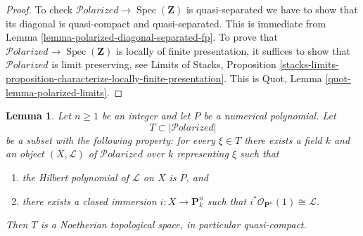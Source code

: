 \documentclass{stacks-project}
\theoremstyle{plain}
\newtheorem{lemma}[subsection]{Lemma}
\theoremstyle{definition}
\theoremstyle{remark}
\numberwithin{equation}{subsection}
\def\Spec{\mathop{\mathrm{Spec}}}
\def\Polarizedstack{\mathcal{P}\!\mathit{olarized}}
\begin{document}
\begin{proof}
To check $\Polarizedstack \to \Spec(\mathbf{Z})$ is quasi-separated we have to
show that its diagonal is quasi-compact and quasi-separated.
This is immediate from Lemma \ref{lemma-polarized-diagonal-separated-fp}.
To prove that $\Polarizedstack \to \Spec(\mathbf{Z})$ is locally of finite
presentation, it suffices to show that $\Polarizedstack$
is limit preserving, see Limits of Stacks, Proposition
\ref{stacks-limits-proposition-characterize-locally-finite-presentation}.
This is Quot, Lemma \ref{quot-lemma-polarized-limits}.
\end{proof}

\begin{lemma}
\label{lemma-bounded-polarized}
Let $n \geq 1$ be an integer and let $P$ be a numerical polynomial.
Let
$$
T \subset |\Polarizedstack|
$$
be a subset with the following property: for every $\xi \in T$
there exists a field $k$ and an object $(X, \mathcal{L})$
of $\Polarizedstack$ over $k$ representing $\xi$ such that
\begin{enumerate}
\item the Hilbert polynomial of $\mathcal{L}$ on $X$ is $P$, and
\item there exists a closed immersion $i : X \to \mathbf{P}^n_k$
such that $i^*\mathcal{O}_{\mathbf{P}^n}(1) \cong \mathcal{L}$.
\end{enumerate}
Then $T$ is a Noetherian topological space, in particular quasi-compact.
\end{lemma}
\end{document}
